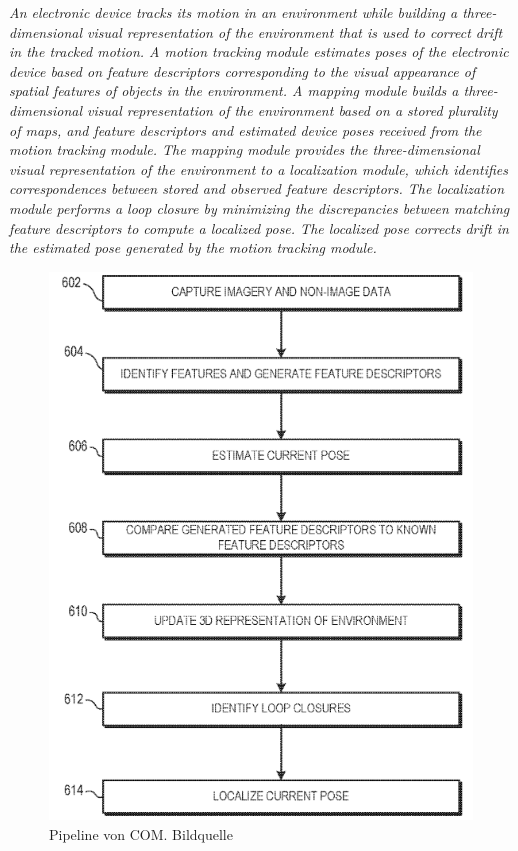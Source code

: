 \glqq \textit{An electronic device tracks its motion in an environment while building a three-dimensional visual representation of the environment that is used to correct drift in the tracked motion. A motion tracking module estimates poses of the electronic device based on feature descriptors corresponding to the visual appearance of spatial features of objects in the environment. A mapping module builds a three-dimensional visual representation of the environment based on a stored plurality of maps, and feature descriptors and estimated device poses received from the motion tracking module. The mapping module provides the three-dimensional visual representation of the environment to a localization module, which identifies correspondences between stored and observed feature descriptors. The localization module performs a loop closure by minimizing the discrepancies between matching feature descriptors to compute a localized pose. The localized pose corrects drift in the estimated pose generated by the motion tracking module.}\grqq{}


\begin{figure}[H]
	\centering
	\includegraphics[scale=0.65]{com.png}
	\caption{Pipeline von COM. Bildquelle \cite{patent}}
\end{figure} 

